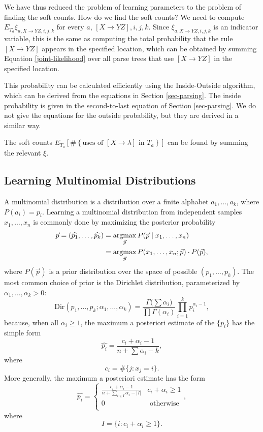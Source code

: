 We have thus reduced the problem of learning parameters to the problem
of finding the soft counts. How do we find the soft counts?  We need
to compute $E_{T_a} \xi_{a,X\to YZ,i,j,k}$ for every $a$, $[X\to YZ],
i,j,k$. Since $\xi_{a, X\to YZ,i,j,k}$ is an indicator variable, this
is the same as computing the total probability that the rule $[X\to
YZ]$ appears in the specified location, which can be obtained by
summing Equation \eqref{joint-likelihood} over all parse trees that
use $[X\to YZ]$ in the specified location.

This probability can be calculated efficiently using the
Inside-Outside algorithm, which can be derived from the equations in
Section \ref{sec-parsing}. The inside probability is given in the
second-to-last equation of Section \ref{sec-parsing}. We do not give
the equations for the outside probability, but they are derived in a
similar way.

The soft counts $E_{T_a}\left[ \#\left\{\mbox{uses of
    }[X\to \lambda] \mbox{ in } T_a\right\}\right]$ can be found by summing the
relevant $\xi$.

\subsection{Learning Multinomial Distributions}
\label{sec-multinomial}

A multinomial distribution is a distribution over a finite alphabet
$a_1,\dots, a_k$, where $P(a_i)=p_i$. Learning a multinomial
distribution from independent samples $x_1,\dots, x_n$ is commonly done by
maximizing the posterior probability 
\begin{align*}
\vec{p} = (\widehat{p_1},\dots, \widehat{p_k}) &= \operatorname*{argmax}_{\vec{p}}
P(\vec{p} \mid x_1,\dots,x_n )\\
&= \operatorname*{argmax}_{\vec{p}} P(x_1,\dots,x_n; \vec{p}) \cdot P(\vec{p}),
\end{align*}
where $P(\vec{p})$ is a prior distribution over the space of possible
$(p_1,\dots,p_k)$. The most common choice of prior is the Dirichlet
distribution, parameterized by $\alpha_1,\dots, \alpha_k > 0$:
$$\mathrm{Dir}(p_1,\dots, p_k; \alpha_1,\dots, \alpha_k) = \frac{\Gamma\bigl(\sum \alpha_i\bigr)}{\prod \Gamma(\alpha_i)} \prod_{i=1}^k p_i^{\alpha_i - 1},$$
because, when all $\alpha_i \ge 1$, the maximum a posteriori estimate of the $\{p_i\}$ has the simple form
$$\widehat{p_i} = \frac{ c_i + \alpha_i - 1}{ n + \sum
  \alpha_i - k},$$ 
where
$$c_i = \#\{j : x_j = i\}.$$
More generally, the maximum a posteriori estimate has the form
$$\widehat{p_i} = \begin{cases}
\frac{ c_i + \alpha_i - 1}{ n + \sum_{i\in I} \alpha_i - |I|} & c_i + \alpha_i \ge 1\\
0 & \mbox{ otherwise}\\
\end{cases},$$ 
where
$$I = \{i : c_i + \alpha_i \ge 1\}.$$

